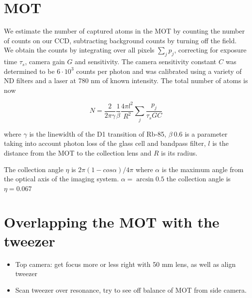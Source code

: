  
 \section{MOT}
 
We estimate the number of captured atoms in the MOT by counting the number of counts on our \ac{CCD}, subtracting background counts by turning off the field. We obtain the counts by integrating over all pixels $\sum_j p_j$, correcting for exposure time $\tau_s$, camera gain $G$ and sensitivity. The camera sensitivity constant $C$ was determined to be $6 \cdot 10^3$ counts per photon and was calibrated using a variety of ND filters and a laser at 780 nm of known intensity. The total number of atoms is now
 
 \begin{equation}
     N = \frac{2}{2\pi\gamma} \frac{1}{\beta} \frac{4\pi l^2}{R^2} \sum_j \frac{p_j}{\tau_s G C}
 \end{equation}
 
 where $\gamma$ is the linewidth of the D1 transition of Rb-85, $\beta ~0.6$ is a parameter taking into account photon loss of the glass cell and bandpass filter, $l$ is the distance from the MOT to the collection lens and $R$ is its radius. 
 
The collection angle $\eta$ is $2\pi(1-cos{\alpha})/4\pi$ where $\alpha$ is the maximum angle from the optical axis of the imaging system. $\alpha=\arcsin{0.5}$ the collection angle is $\eta = 0.067$

\section{Overlapping the MOT with the tweezer}

\begin{itemize}
    \item Top camera: get focus more or less right with 50 mm lens, as well as align tweezer
    \item Scan tweezer over resonance, try to see off balance of MOT from side camera. 
\end{itemize}
